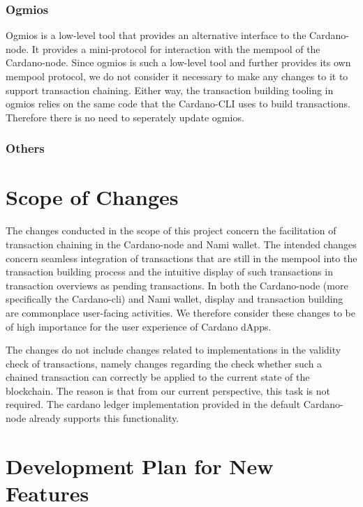 \documentclass[11pt]{article}
\begin{document}
\subsubsection{Ogmios}

Ogmios is a low-level tool that provides an alternative interface to the Cardano-node.
It provides a mini-protocol for interaction with the mempool of the Cardano-node.
Since ogmios is such a low-level tool and further provides its own mempool protocol, we do not consider it necessary to make any changes to it to support transaction chaining.
Either way, the transaction building tooling in ogmios relies on the same code
that the Cardano-CLI uses to build transactions.
Therefore there is no need to seperately update ogmios.

\subsubsection{Others}

\section{Scope of Changes}

The changes conducted in the scope of this project concern the facilitation of transaction chaining in
the Cardano-node and Nami wallet.
The intended changes concern seamless integration of transactions that are still in the mempool into the transaction building process
and the intuitive display of such transactions in transaction overviews as pending transactions.
In both the Cardano-node (more specifically the Cardano-cli) and Nami wallet,
display and transaction building are commonplace user-facing activities.
We therefore consider these changes to be of high importance for the user experience of Cardano dApps.

The changes do not include changes related to implementations in the validity check of transactions,
namely changes regarding the check whether such a chained transaction can correctly be applied to the current state of the blockchain.
The reason is that from our current perspective, this task is not required.
The cardano ledger implementation provided in the default Cardano-node already supports this functionality.

\section{Development Plan for New Features}
\end{document}
